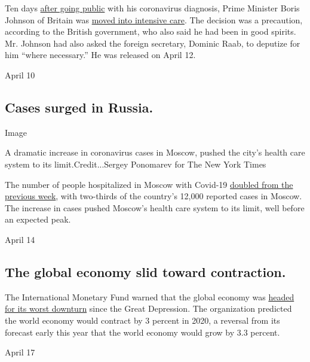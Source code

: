 Ten days
\href{https://twitter.com/BorisJohnson/status/1243496858095411200}{after
going public} with his coronavirus diagnosis, Prime Minister Boris
Johnson of Britain was
\href{https://www.nytimes3xbfgragh.onion/2020/04/06/world/europe/boris-johnson-coronavirus-hospital-intensive-care.html}{moved
into intensive care}. The decision was a precaution, according to the
British government, who also said he had been in good spirits. Mr.
Johnson had also asked the foreign secretary, Dominic Raab, to deputize
for him ``where necessary.'' He was released on April 12.

April 10

\hypertarget{cases-surged-in-russia}{%
\subsection{Cases surged in Russia.}\label{cases-surged-in-russia}}

Image

A dramatic increase in coronavirus cases in Moscow, pushed the city's
health care system to its limit.Credit...Sergey Ponomarev for The New
York Times

The number of people hospitalized in Moscow with Covid-19
\href{https://www.nytimes3xbfgragh.onion/2020/04/10/world/europe/coronavirus-russia-moscow-putin.html?action=click\&module=RelatedLinks\&pgtype=Article}{doubled
from the previous week}, with two-thirds of the country's 12,000
reported cases in Moscow. The increase in cases pushed Moscow's health
care system to its limit, well before an expected peak.

April 14

\hypertarget{the-global-economy-slid-toward-contraction}{%
\subsection{The global economy slid toward
contraction.}\label{the-global-economy-slid-toward-contraction}}

The International Monetary Fund warned that the global economy was
\href{https://www.nytimes3xbfgragh.onion/2020/04/14/us/politics/coronavirus-economy-recession-depression.html?action=click\&module=RelatedLinks\&pgtype=Article}{headed
for its worst downturn} since the Great Depression. The organization
predicted the world economy would contract by 3 percent in 2020, a
reversal from its forecast early this year that the world economy would
grow by 3.3 percent.

April 17

